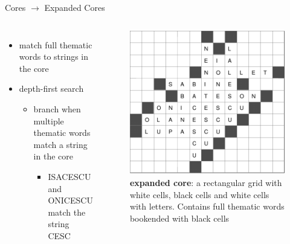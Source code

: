 \documentclass[aspectratio=169,usenames,dvipsnames]{beamer}
\newcommand{\tco}[1]{\textcolor{m2}{#1}}
\newcommand{\bei}{\begin{itemize}}
\newcommand{\eei}{\end{itemize}}
\newcommand{\ie}{\item}
\numberwithin{equation}{section}
\numberwithin{theorem}{section}
\numberwithin{lem}{section}
\numberwithin{df}{section}
\begin{document}


\begin{frame}{Cores $\to$ Expanded Cores}

\begin{columns}

\bei
\ie match full thematic words to strings in the core

\bigskip

\ie depth-first search
\bei
\ie branch when multiple thematic words match a string in the core
\bei
\ie ISA\tco{CESC}U and ONI\tco{CESC}U match the string \tco{CESC}
\eei
\eei
\eei


\begin{figure}
\includegraphics[width=0.9\columnwidth]{_plots/extcore-alive-0-puzzle-72-2975-1488--1--1.pdf}
\caption{{\bf expanded core}: a rectangular grid with white cells, black cells and white cells with letters. Contains full thematic words bookended with black cells}
\end{figure}

\end{columns}

\end{frame}

\end{document}
